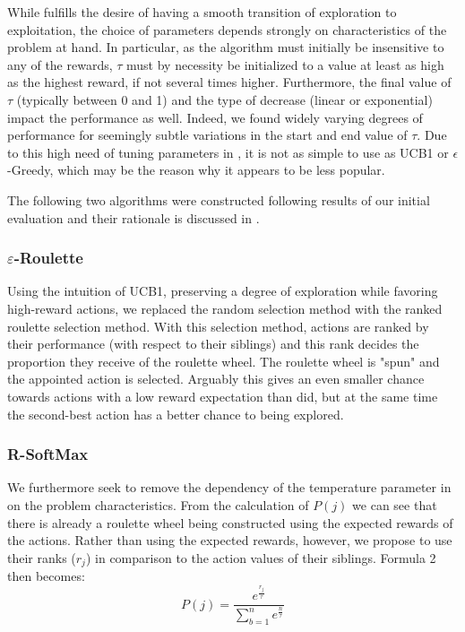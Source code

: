 While \soft fulfills the desire of having a smooth transition of exploration to exploitation, the choice of parameters depends strongly on characteristics of the problem at hand. In particular, as the algorithm must initially be insensitive to any of the rewards, $\tau$ must by necessity be initialized to a value at least as high as the highest reward, if not several times higher. Furthermore, the final value of $\tau$ (typically between 0 and 1) and the type of decrease (linear or exponential) impact the performance as well. Indeed, we found widely varying degrees of performance for seemingly subtle variations in the start and end value of $\tau$. Due to this high need of tuning parameters in \soft, it is not as simple to use as UCB1 or $\epsilon$-Greedy, which may be the reason why it appears to be less popular.

The following two algorithms were constructed following results of our initial evaluation and their rationale is discussed in .

\subsubsection{$\varepsilon$-Roulette}
\label{subsec:roulette}
Using the intuition of UCB1, preserving a degree of exploration while favoring high-reward actions, we replaced the random selection method with the ranked roulette selection method. With this selection method, actions are ranked by their performance (with respect to their siblings) and this rank decides the proportion they receive of the roulette wheel. The roulette wheel is "spun" and the appointed action is selected. Arguably this gives an even smaller chance towards actions with a low reward expectation than \egreedy did, but at the same time the second-best action has a better chance to being explored. 

\subsubsection{R-SoftMax}
We furthermore seek to remove the dependency of the temperature parameter in \soft on the problem characteristics. From the calculation of $P(j)$ we can see that there is already a roulette wheel being constructed using the expected rewards of the actions. Rather than using the expected rewards, however, we propose to use their ranks ($r_j$) in comparison to the action values of their siblings. Formula 2 then becomes:
\begin{equation}
P(j) = \frac{e^\frac{r_j}{\tau}}{\sum_{b=1}^{n} e^\frac{n}{\tau}}
\end{equation}

